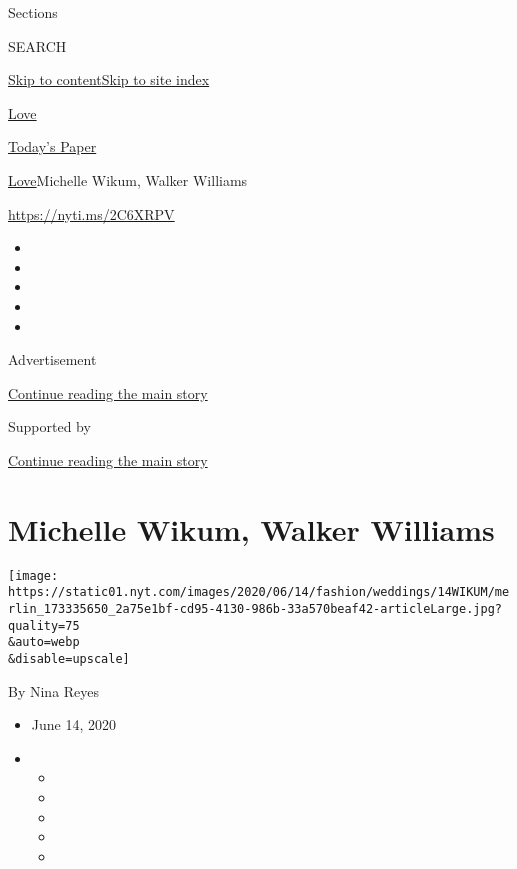 Sections

SEARCH

\protect\hyperlink{site-content}{Skip to
content}\protect\hyperlink{site-index}{Skip to site index}

\href{https://www.nytimes.com/section/fashion/weddings}{Love}

\href{https://myaccount.nytimes.com/auth/login?response_type=cookie\&client_id=vi}{}

\href{https://www.nytimes.com/section/todayspaper}{Today's Paper}

\href{/section/fashion/weddings}{Love}\textbar{}Michelle Wikum, Walker
Williams

\url{https://nyti.ms/2C6XRPV}

\begin{itemize}
\item
\item
\item
\item
\item
\end{itemize}

Advertisement

\protect\hyperlink{after-top}{Continue reading the main story}

Supported by

\protect\hyperlink{after-sponsor}{Continue reading the main story}

\hypertarget{michelle-wikum-walker-williams}{%
\section{Michelle Wikum, Walker
Williams}\label{michelle-wikum-walker-williams}}

\texttt{[image: https://static01.nyt.com/images/2020/06/14/fashion/weddings/14WIKUM/merlin\_173335650\_2a75e1bf-cd95-4130-986b-33a570beaf42-articleLarge.jpg?quality=75\\\&auto=webp\\\&disable=upscale]}

By Nina Reyes

\begin{itemize}
\item
  June 14, 2020
\item
  \begin{itemize}
  \item
  \item
  \item
  \item
  \item
  \end{itemize}
\end{itemize}

